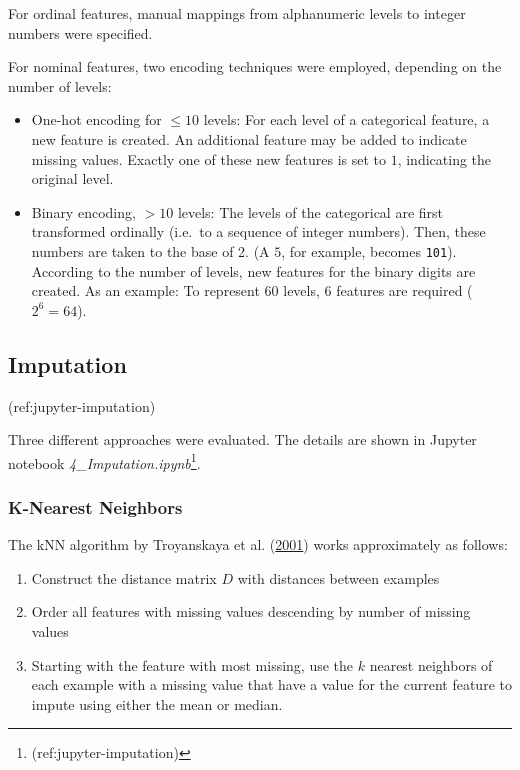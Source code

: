 \documentclass[
  11pt,
  a4paper,
  DIV=12,captions=tableheading,oneside,titlepage=firstiscover,abstracton]{scrreprt}
\providecommand{\tightlist}{%
  \setlength{\itemsep}{0pt}\setlength{\parskip}{0pt}}
\providecommand{\tightlist}{%
  \setlength{\itemsep}{0pt}\setlength{\parskip}{0pt}}
\begin{document}
For ordinal features, manual mappings from alphanumeric levels to integer numbers were specified.

For nominal features, two encoding techniques were employed, depending on the number of levels:

\begin{itemize}
\item
  One-hot encoding for \(\leq 10\) levels: For each level of a categorical feature, a new feature is created. An additional feature may be added to indicate missing values. Exactly one of these new features is set to \(1\), indicating the original level.
\item
  Binary encoding, \(> 10\) levels: The levels of the categorical are first transformed ordinally (i.e.~to a sequence of integer numbers). Then, these numbers are taken to the base of 2. (A \(5\), for example, becomes \texttt{101}). According to the number of levels, new features for the binary digits are created. As an example: To represent 60 levels, 6 features are required (\(2^6=64\)).
\end{itemize}

\hypertarget{imputation}{%
\subsection{Imputation}\label{imputation}}

(ref:jupyter-imputation)

Three different approaches were evaluated. The details are shown in Jupyter notebook \emph{4\_Imputation.ipynb}\footnote{(ref:jupyter-imputation)}.

\hypertarget{k-nearest-neighbors}{%
\subsubsection{K-Nearest Neighbors}\label{k-nearest-neighbors}}

The kNN algorithm by Troyanskaya et al. (\protect\hyperlink{ref-troyanskaya2001missing}{2001}) works approximately as follows:

\begin{enumerate}
\def\labelenumi{\arabic{enumi}.}
\tightlist
\item
  Construct the distance matrix \(D\) with distances between examples
\item
  Order all features with missing values descending by number of missing values
\item
  Starting with the feature with most missing, use the \(k\) nearest neighbors of each example with a missing value that have a value for the current feature to impute using either the mean or median.
\end{enumerate}
\end{document}
